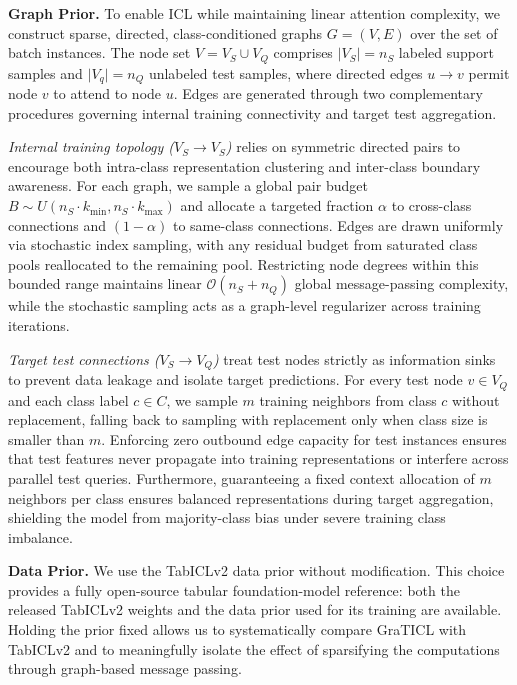 \documentclass{article} %
\begin{document}
\textbf{Graph Prior.}
To enable ICL while maintaining linear attention complexity, we construct sparse, directed, class-conditioned graphs $G = (V, E)$ over the set of batch instances. The node set $V = V_{S} \cup V_{Q}$ comprises $\vert{}V_{S}\vert{} = n_S$ labeled support samples and $\vert{}V_{q}\vert{} = n_Q$ unlabeled test samples, where directed edges $u \to v$ permit node $v$ to attend to node $u$. Edges are generated through two complementary procedures governing internal training connectivity and target test aggregation.

\textit{Internal training topology ($V_{S} \to V_{S}$)} relies on symmetric directed pairs to encourage both intra-class representation clustering and inter-class boundary awareness. For each graph, we sample a global pair budget $B \sim U(n_S \cdot k_{\text{min}}, n_S \cdot k_{\text{max}})$ and allocate a targeted fraction $\alpha$ to cross-class connections and $(1 - \alpha)$ to same-class connections. Edges are drawn uniformly via stochastic index sampling, with any residual budget from saturated class pools reallocated to the remaining pool. Restricting node degrees within this bounded range maintains linear $\mathcal{O}(n_S + n_Q)$ global message-passing complexity, while the stochastic sampling acts as a graph-level regularizer across training iterations.

\textit{Target test connections ($V_S \to V_{Q}$)} treat test nodes strictly as information sinks to prevent data leakage and isolate target predictions. For every test node $v \in V_{Q}$ and each class label $c \in C$, we sample $m$ training neighbors from class $c$ without replacement, falling back to sampling with replacement only when class size is smaller than $m$. Enforcing zero outbound edge capacity for test instances ensures that test features never propagate into training representations or interfere across parallel test queries. Furthermore, guaranteeing a fixed context allocation of $m$ neighbors per class ensures balanced representations during target aggregation, shielding the model from majority-class bias under severe training class imbalance.

\textbf{Data Prior.} We use the TabICLv2 data prior without modification. This choice provides a fully open-source tabular foundation-model reference: both the released TabICLv2 weights and the data prior used for its training are available. Holding the prior fixed allows us to systematically compare GraTICL with TabICLv2 and to meaningfully isolate the effect of sparsifying the computations through graph-based message passing.
\end{document}

